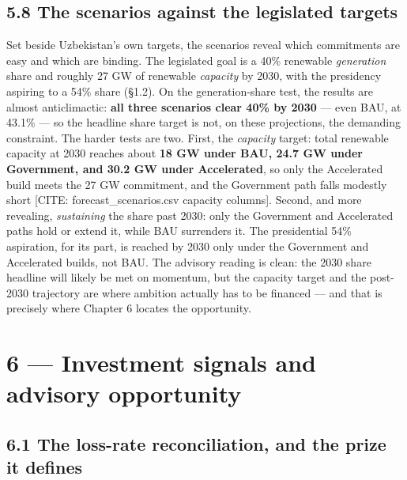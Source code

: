 \documentclass[10pt,twocolumn]{article}
\newcommand{\mk}[1]{{\color{amber}\small #1}}
\begin{document}
\subsection*{5.8 The scenarios against the legislated targets}

Set beside Uzbekistan's own targets, the scenarios reveal which commitments are easy and which are binding. The legislated goal is a 40\% renewable \textit{generation} share and roughly 27 GW of renewable \textit{capacity} by 2030, with the presidency aspiring to a 54\% share (\S{}1.2). On the generation-share test, the results are almost anticlimactic: \textbf{all three scenarios clear 40\% by 2030} --- even BAU, at 43.1\% --- so the headline share target is not, on these projections, the demanding constraint. The harder tests are two. First, the \textit{capacity} target: total renewable capacity at 2030 reaches about \textbf{18 GW under BAU, 24.7 GW under Government, and 30.2 GW under Accelerated}, so only the Accelerated build meets the 27 GW commitment, and the Government path falls modestly short \mk{[CITE: forecast\_scenarios.csv capacity columns]}. Second, and more revealing, \textit{sustaining} the share past 2030: only the Government and Accelerated paths hold or extend it, while BAU surrenders it. The presidential 54\% aspiration, for its part, is reached by 2030 only under the Government and Accelerated builds, not BAU. The advisory reading is clean: the 2030 share headline will likely be met on momentum, but the capacity target and the post-2030 trajectory are where ambition actually has to be financed --- and that is precisely where Chapter 6 locates the opportunity.

\section*{6 --- Investment signals and advisory opportunity}

\subsection*{6.1 The loss-rate reconciliation, and the prize it defines}
\end{document}
